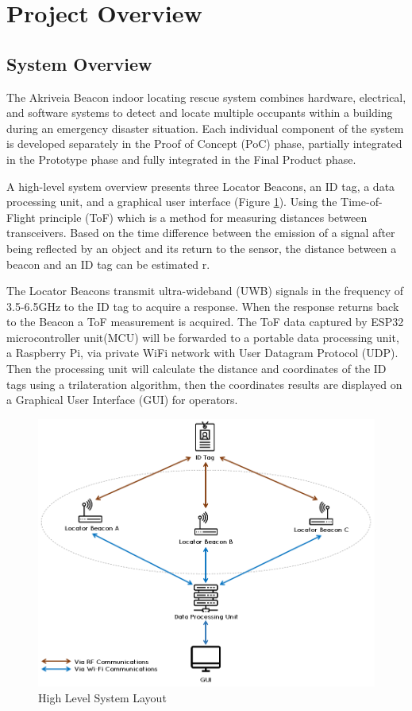 

\setcounter{section}{1}
\section{Project Overview}
\bigskip
\subsection{System Overview}
\medskip
The Akriveia Beacon indoor locating rescue system combines hardware, electrical, and software systems to detect and locate multiple occupants within a building during an emergency disaster situation. Each individual component of the system is developed separately in the Proof of Concept (PoC) phase, partially integrated in the Prototype phase and fully integrated in the Final Product phase. 

\bigskip
A high-level system overview presents three Locator Beacons, an ID tag, a data processing unit, and a graphical user interface (Figure \ref{sys_arch}). Using the Time-of-Flight principle (\Gls{ToF}) which is a method for measuring distances between transceivers. Based on the time difference between the emission of a signal after being reflected by an object and its return to the sensor, the distance between a beacon and an ID tag can be estimated r\cite{R2-0}. 

\bigskip
The Locator Beacons transmit ultra-wideband (UWB) signals in the frequency of 3.5-6.5GHz to the ID tag to acquire a response. When the response returns back to the Beacon a ToF measurement is acquired. The ToF data captured by ESP32 microcontroller unit(\Gls{MCU}) will be forwarded to a portable data processing unit, a Raspberry Pi, via private WiFi network with User Datagram Protocol (\Gls{UDP}). Then the processing unit will calculate the distance and coordinates of the ID tags using a trilateration algorithm, then the coordinates results are displayed on a Graphical User Interface (\Gls{GUI}) for operators.


\medskip
\begin{figure}[H]
\centering
    \includegraphics[scale=0.60]{./images/00_sys_arch.png}
    \caption{High Level System Layout}
    \label{sys_arch}
\end{figure}
\pagebreak

